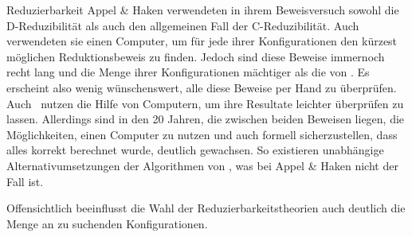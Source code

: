 \begin{section}{Reduzierbarkeit}
 Appel \& Haken verwendeten in ihrem Beweisversuch sowohl die D-Reduzibilität als auch den allgemeinen Fall der C-Reduzibilität. Auch verwendeten sie einen Computer, um für jede ihrer Konfigurationen den kürzest möglichen Reduktionsbeweis zu finden. Jedoch sind diese Beweise immernoch recht lang und die Menge ihrer Konfigurationen mächtiger als die von \rsst. Es erscheint also wenig wünschenswert, alle diese Beweise per Hand zu überprüfen. \\
 Auch \rsst\-\ nutzen die Hilfe von Computern, um ihre Resultate leichter überprüfen zu lassen. Allerdings sind in den 20 Jahren, die zwischen beiden Beweisen liegen, die Möglichkeiten, einen Computer zu nutzen und auch formell sicherzustellen, dass alles korrekt berechnet wurde, deutlich gewachsen. So existieren unabhängige Alternativumsetzungen der Algorithmen von \rsst, was bei Appel \& Haken nicht der Fall ist. 
 
 Offensichtlich beeinflusst die Wahl der Reduzierbarkeitstheorien auch deutlich die Menge an zu suchenden Konfigurationen.
\end{section}
